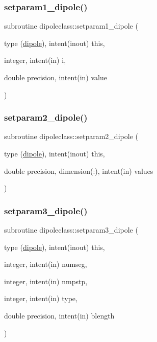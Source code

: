 \subsubsection{\texorpdfstring{setparam1\_dipole()}{setparam1\_dipole()}}
{\footnotesize\ttfamily subroutine dipoleclass\+::setparam1\+\_\+dipole (\begin{DoxyParamCaption}\item[{type (\mbox{\hyperlink{namespacedipoleclass_structdipoleclass_1_1dipole}{dipole}}), intent(inout)}]{this,  }\item[{integer, intent(in)}]{i,  }\item[{double precision, intent(in)}]{value }\end{DoxyParamCaption})}

\mbox{\label{namespacedipoleclass_af9b4f7bb26e407880166d1b7d19f8877}} 
\subsubsection{\texorpdfstring{setparam2\_dipole()}{setparam2\_dipole()}}
{\footnotesize\ttfamily subroutine dipoleclass\+::setparam2\+\_\+dipole (\begin{DoxyParamCaption}\item[{type (\mbox{\hyperlink{namespacedipoleclass_structdipoleclass_1_1dipole}{dipole}}), intent(inout)}]{this,  }\item[{double precision, dimension(\+:), intent(in)}]{values }\end{DoxyParamCaption})}

\mbox{\label{namespacedipoleclass_a46e12e75054e010d776e23895101e223}} 
\subsubsection{\texorpdfstring{setparam3\_dipole()}{setparam3\_dipole()}}
{\footnotesize\ttfamily subroutine dipoleclass\+::setparam3\+\_\+dipole (\begin{DoxyParamCaption}\item[{type (\mbox{\hyperlink{namespacedipoleclass_structdipoleclass_1_1dipole}{dipole}}), intent(inout)}]{this,  }\item[{integer, intent(in)}]{numseg,  }\item[{integer, intent(in)}]{nmpstp,  }\item[{integer, intent(in)}]{type,  }\item[{double precision, intent(in)}]{blength }\end{DoxyParamCaption})}



